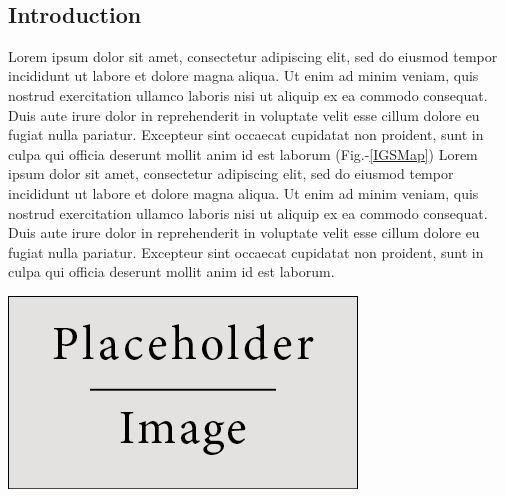 \documentclass[a0,portrait]{a0poster}
\begin{document}
\begin{minipage}[c]{\linewidth}
{\begin{minipage}[c]{0.15\textwidth}
\hspace{1cm}
\end{minipage}}
\\[0.1cm]%
\color{Orange}\setlength\FrameRule{10pt}
\begin{framed}
\vspace{0.5cm}
\begin{multicols}{2} %
\color{Black}
\section*{Introduction}
Lorem ipsum dolor sit amet, consectetur adipiscing elit, sed do eiusmod tempor incididunt ut labore et dolore magna aliqua. Ut enim ad minim veniam, quis nostrud exercitation ullamco laboris nisi ut aliquip ex ea commodo consequat. Duis aute irure dolor in reprehenderit in voluptate velit esse cillum dolore eu fugiat nulla pariatur. Excepteur sint occaecat cupidatat non proident, sunt in culpa qui officia deserunt mollit anim id est laborum (Fig.-\ref{IGSMap}) Lorem ipsum dolor sit amet, consectetur adipiscing elit, sed do eiusmod tempor incididunt ut labore et dolore magna aliqua. Ut enim ad minim veniam, quis nostrud exercitation ullamco laboris nisi ut aliquip ex ea commodo consequat. Duis aute irure dolor in reprehenderit in voluptate velit esse cillum dolore eu fugiat nulla pariatur. Excepteur sint occaecat cupidatat non proident, sunt in culpa qui officia deserunt mollit anim id est laborum.\\
\begin{center}
\hspace*{\fill}
\includegraphics[width=0.49\linewidth]{figures/placeholder}

\end{center}
\end{multicols}
\end{framed}
\end{minipage}
\end{document}
